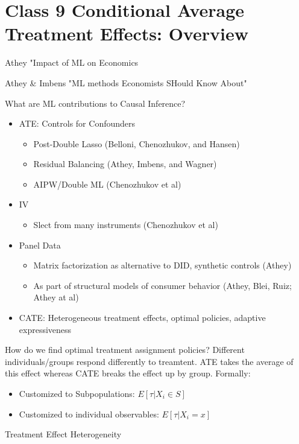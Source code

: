 \documentclass{article}
\begin{document}
\section{Class 9 Conditional Average Treatment Effects: Overview}

Athey "Impact of ML on Economics

Athey \& Imbens "ML methods Economists SHould Know About"

What are ML contributions to Causal Inference?
\begin{itemize}
    \item ATE: Controls for Confounders
    \begin{itemize}
        \item Post-Double Lasso (Belloni, Chenozhukov, and Hansen)
        \item Residual Balancing (Athey, Imbens, and Wagner)
        \item AIPW/Double ML (Chenozhukov et al)
    \end{itemize}
    \item IV
    \begin{itemize}
        \item Slect from many instruments (Chenozhukov et al)
    \end{itemize}
    \item Panel Data
    \begin{itemize}
        \item Matrix factorization as alternative to DID, synthetic controls (Athey)
        \item As part of structural models of consumer behavior (Athey, Blei, Ruiz; Athey at al)
    \end{itemize}
    \item CATE: Heterogeneous treatment effects, optimal policies, adaptive expressiveness
\end{itemize}

How do we find optimal treatment assignment policies? Different individuals/groups respond differently to treamtent. ATE takes the average of this effect whereas CATE breaks the effect up by group. Formally:

\begin{itemize}
    \item Customized to Subpopulations: $E[ \tau | X_i \in S]$
    \item Customized to individual observables: $E[\tau | X_i = x]$
\end{itemize}


Treatment Effect Heterogeneity
\end{document}
